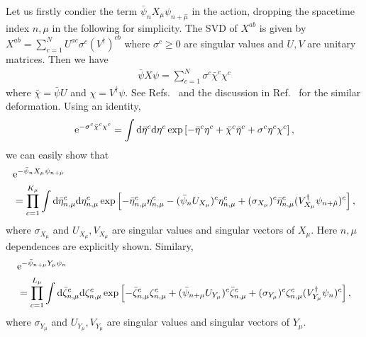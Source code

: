  
Let us firstly condier the term $\bar \psi_n X_\mu \psi_{n+\hat\mu}$ in the action,
dropping the spacetime index $n, \mu$ in the following for simplicity.  
The SVD of $X^{ab}$ is given by
$X^{ab}=\sum_{c=1}^N U^{ac} \sigma^c (V^\dag)^{cb}$ 
where $\sigma^c \ge0$ are singular values and $U,V$ are unitary matrices. 
Then we have
\begin{align}
\label{eq:step1}
\bar{\psi} X \psi= \sum_{c=1}^N \sigma^{c}\bar{\chi}^c \chi^c
\end{align}
where $\bar\chi = \bar\psi U$ and  $\chi = V^\dag\psi$. 
See Refs.~\cite{Shimizu:2014uva,Shimizu:2014fsa,Shimizu:2017onf,Takeda:2014vwa,Kadoh:2018hqq} 
and the discussion in Ref.~\cite{Meurice:2012wp} for the similar deformation. 
%
Using an identity,  
\begin{align}
\label{eq:identity}
	\mathrm{e}^{- \sigma^{c} \bar{\chi}^c  \chi^c}
=\int\mathrm{d}\bar{\eta}^c \mathrm{d}\eta^c
\exp\left[-\bar{\eta}^c \eta^c +\bar{\chi}^c  \bar{\eta}^c +  \sigma^{c}  \eta^c \chi^c \right],
\end{align}
we can easily show that
\begin{align}
\label{eq:basic_id1}
&\mathrm{e}^{-\bar{\psi}_{n} X_\mu \psi_{n+\hat\mu} } \nonumber\\
&=  \prod_{c=1}^{K_\mu}  
\int\mathrm{d}\bar{\eta}^{c}_{n,\mu} \mathrm{d}\eta^{c}_{n,\mu}
\exp\left[-\bar{\eta}^{c}_{n,\mu} \eta^{c}_{n,\mu} -(\bar{\psi}_{n}U_{X_\mu})^{c}  \eta^{c}_{n,\mu} +  
(\sigma_{X_\mu})^{c}  \bar{\eta}^{c}_{n,\mu} (V^{\dag}_{X_\mu}\psi_{n+\hat\mu})^{c} \right],
\end{align}
where $\sigma_{X_\mu}$  and $U_{X_\mu}, V_{X_\mu}$ are singular values and singular vectors of $X_\mu$. 
Here $n,\mu$ dependences are explicitly shown. 
Similary, 
\begin{align}
\label{eq:basic_id2}
&\mathrm{e}^{-\bar{\psi}_{n+\mu} Y_\mu \psi_{n} } \nonumber\\
&=  \prod_{c=1}^{L_\mu}  
\int\mathrm{d}\bar{\zeta}^{c}_{n,\mu} \mathrm{d}\zeta^{c}_{n,\mu}
\exp\left[-\bar{\zeta}^{c}_{n,\mu} \zeta^{c}_{n,\mu} +(\bar{\psi}_{n+\mu}U_{Y_\mu})^{c}  \bar{\zeta}^{c}_{n,\mu} + 
 (\sigma_{Y_\mu})^{c}  \zeta^{c}_{n,\mu} (V^{\dag}_{Y_\mu}\psi_{n})^{c} \right],
\end{align}
where $\sigma_{Y_\mu}$  and $U_{Y_\mu}, V_{Y_\mu}$  are singular values and singular vectors of $Y_\mu$. 





